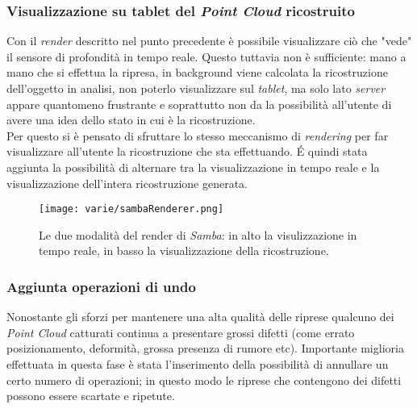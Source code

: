 \subsubsection{Visualizzazione su tablet del \emph{Point Cloud} ricostruito}
Con il \emph{render} descritto nel punto precedente è possibile visualizzare ciò che "vede" il sensore di profondità in tempo reale. Questo tuttavia non è sufficiente: mano a mano che si effettua la ripresa, in background viene calcolata la ricostruzione dell'oggetto in analisi, non poterlo visualizzare sul \emph{tablet}, ma solo lato \emph{server} appare quantomeno frustrante e soprattutto non da la possibilità all'utente di avere una idea dello stato in cui è la ricostruzione. \\
Per questo si è pensato di sfruttare lo stesso meccanismo di \emph{rendering} per far visualizzare all'utente la ricostruzione che sta effettuando. É quindi stata aggiunta la possibilità di alternare tra la visualizzazione in tempo reale e la visualizzazione dell'intera ricostruzione generata.\\
\begin{figure}[!h] 
    \centering 
    \texttt{[image: varie/sambaRenderer.png]} 
    \caption{Le due modalità del render di \emph{Samba}: in alto la visulizzazione in tempo reale, in basso la visualizzazione della ricostruzione.}
\end{figure}


\subsubsection{Aggiunta operazioni di undo}
Nonostante gli sforzi per mantenere una alta qualità delle riprese qualcuno dei \emph{Point Cloud} catturati continua a presentare grossi difetti (come errato posizionamento, deformità, grossa presenza di rumore etc).
Importante miglioria effettuata in questa fase è stata l'inserimento della possibilità di annullare un certo numero di operazioni; in questo modo le riprese che contengono dei difetti possono essere scartate e ripetute.

